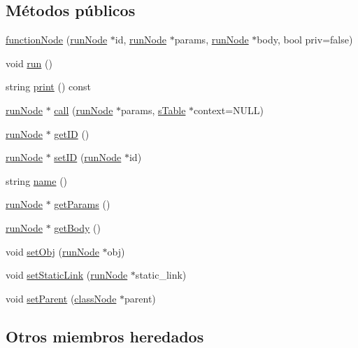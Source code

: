 \subsection*{Métodos públicos}
\begin{DoxyCompactItemize}
\item 
\hyperlink{classfunctionNode_a0e21e8443c73a4276be01ac9a6d57044}{function\-Node} (\hyperlink{classrunNode}{run\-Node} $\ast$id, \hyperlink{classrunNode}{run\-Node} $\ast$params, \hyperlink{classrunNode}{run\-Node} $\ast$body, bool priv=false)
\item 
void \hyperlink{classfunctionNode_acfd33517bb4dfab471fe0d1ec72ffb11}{run} ()
\item 
string \hyperlink{classfunctionNode_ac6aa475befa6f47e952f62498bc2f281}{print} () const 
\item 
\hyperlink{classrunNode}{run\-Node} $\ast$ \hyperlink{classfunctionNode_a0913005fb75aeddbdfbbae42cbff5144}{call} (\hyperlink{classrunNode}{run\-Node} $\ast$params, \hyperlink{classsTable}{s\-Table} $\ast$context=N\-U\-L\-L)
\item 
\hyperlink{classrunNode}{run\-Node} $\ast$ \hyperlink{classfunctionNode_a63cc8e4df75714b2119e19a97bddf6c0}{get\-I\-D} ()
\item 
\hyperlink{classrunNode}{run\-Node} $\ast$ \hyperlink{classfunctionNode_a7833ab934ebe4b4778cbeca42a14db29}{set\-I\-D} (\hyperlink{classrunNode}{run\-Node} $\ast$id)
\item 
string \hyperlink{classfunctionNode_a43185069f96043c02d1abeabc180136b}{name} ()
\item 
\hyperlink{classrunNode}{run\-Node} $\ast$ \hyperlink{classfunctionNode_a6cf11701b16c963ceb3f19414ab4a9c4}{get\-Params} ()
\item 
\hyperlink{classrunNode}{run\-Node} $\ast$ \hyperlink{classfunctionNode_abbd9f7f09e5c77af6235ac28d4c04a0e}{get\-Body} ()
\item 
void \hyperlink{classfunctionNode_aa729a39e2117eda4ab538da400bad7fc}{set\-Obj} (\hyperlink{classrunNode}{run\-Node} $\ast$obj)
\item 
void \hyperlink{classfunctionNode_a8ea36d3033eb1355e82f68c2770764b8}{set\-Static\-Link} (\hyperlink{classrunNode}{run\-Node} $\ast$static\-\_\-link)
\item 
void \hyperlink{classfunctionNode_abb3ca7cfcc00da1e41f68b564e6bd67a}{set\-Parent} (\hyperlink{classclassNode}{class\-Node} $\ast$parent)
\end{DoxyCompactItemize}
\subsection*{Otros miembros heredados}


